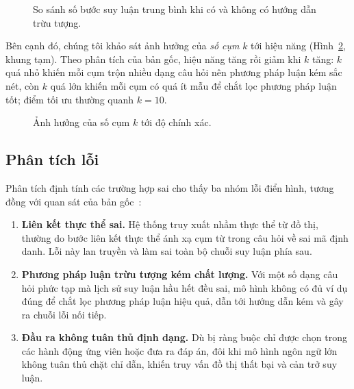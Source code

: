\begin{figure}[ht]
  \centering
  \caption{So sánh số bước suy luận trung bình khi có và không có hướng dẫn trừu tượng.}
  \label{fig:steps}
\end{figure}

Bên cạnh đó, chúng tôi khảo sát ảnh hưởng của \emph{số cụm} $k$ tới hiệu năng (Hình~\ref{fig:clusters},
khung tạm). Theo phân tích của bản gốc, hiệu năng tăng rồi giảm khi $k$ tăng: $k$ quá nhỏ khiến mỗi
cụm trộn nhiều dạng câu hỏi nên phương pháp luận kém sắc nét, còn $k$ quá lớn khiến mỗi cụm có quá ít
mẫu để chắt lọc phương pháp luận tốt; điểm tối ưu thường quanh $k = 10$.

\begin{figure}[ht]
  \centering
  \caption{Ảnh hưởng của số cụm $k$ tới độ chính xác.}
  \label{fig:clusters}
\end{figure}

\subsection{Phân tích lỗi}
\label{sec:errors}

Phân tích định tính các trường hợp sai cho thấy ba nhóm lỗi điển hình, tương đồng với quan sát của
bản gốc~\cite{chen2024ari}:

\begin{enumerate}
  \item \textbf{Liên kết thực thể sai.} Hệ thống truy xuất nhầm thực thể từ đồ thị, thường do bước
  liên kết thực thể ánh xạ cụm từ trong câu hỏi về sai mã định danh. Lỗi này lan truyền và làm sai
  toàn bộ chuỗi suy luận phía sau.
  \item \textbf{Phương pháp luận trừu tượng kém chất lượng.} Với một số dạng câu hỏi phức tạp mà
  lịch sử suy luận hầu hết đều sai, mô hình không có đủ ví dụ đúng để chắt lọc phương pháp luận hiệu
  quả, dẫn tới hướng dẫn kém và gây ra chuỗi lỗi nối tiếp.
  \item \textbf{Đầu ra không tuân thủ định dạng.} Dù bị ràng buộc chỉ được chọn trong các hành động
  ứng viên hoặc đưa ra đáp án, đôi khi mô hình ngôn ngữ lớn không tuân thủ chặt chỉ dẫn, khiến truy
  vấn đồ thị thất bại và cản trở suy luận.
\end{enumerate}

